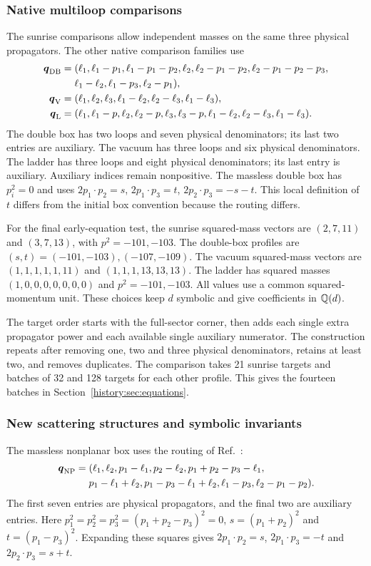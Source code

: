 \subsubsection{Native multiloop comparisons}
The sunrise comparisons allow independent masses on the same three physical propagators. The other native comparison families use
\begin{align}
 \boldsymbol q_{\rm DB}={}&(\ell_1,\ell_1-p_1,\ell_1-p_1-p_2,
 \ell_2,\ell_2-p_1-p_2,\ell_2-p_1-p_2-p_3,\nonumber\\
 &\ell_1-\ell_2,\ell_1-p_3,\ell_2-p_1),\\
 \boldsymbol q_{\rm V}={}&(\ell_1,\ell_2,\ell_3,\ell_1-\ell_2,
 \ell_2-\ell_3,\ell_1-\ell_3),\\
 \boldsymbol q_{\rm L}={}&(\ell_1,\ell_1-p,\ell_2,\ell_2-p,\ell_3,
 \ell_3-p,\ell_1-\ell_2,\ell_2-\ell_3,\ell_1-\ell_3).
\end{align}
The double box has two loops and seven physical denominators; its last two entries are auxiliary. The vacuum has three loops and six physical denominators. The ladder has three loops and eight physical denominators; its last entry is auxiliary. Auxiliary indices remain nonpositive. The massless double box has $p_i^2=0$ and uses $2p_1\cdot p_2=s$, $2p_1\cdot p_3=t$, $2p_2\cdot p_3=-s-t$. This local definition of $t$ differs from the initial box convention because the routing differs.

For the final early-equation test, the sunrise squared-mass vectors are $(2,7,11)$ and $(3,7,13)$, with $p^2=-101,-103$. The double-box profiles are $(s,t)=(-101,-103),(-107,-109)$. The vacuum squared-mass vectors are $(1,1,1,1,1,11)$ and $(1,1,1,13,13,13)$. The ladder has squared masses $(1,0,0,0,0,0,0,0)$ and $p^2=-101,-103$. All values use a common squared-momentum unit. These choices keep $d$ symbolic and give coefficients in $\mathbb Q(d)$.

The target order starts with the full-sector corner, then adds each single extra propagator power and each available single auxiliary numerator. The construction repeats after removing one, two and three physical denominators, retains at least two, and removes duplicates. The comparison takes 21 sunrise targets and batches of 32 and 128 targets for each other profile. This gives the fourteen batches in Section~\ref{history:sec:equations}.

\subsubsection{New scattering structures and symbolic invariants}
The massless nonplanar box uses the routing of Ref.~\cite{KiraOriginal}:
\begin{align}
 \boldsymbol q_{\rm NP}={}&(\ell_1,\ell_2,p_1-\ell_1,p_2-\ell_2,
 p_1+p_2-p_3-\ell_1,\nonumber\\
 &p_1-\ell_1+\ell_2,p_1-p_3-\ell_1+\ell_2,
 \ell_1-p_3,\ell_2-p_1-p_2).
\end{align}
The first seven entries are physical propagators, and the final two are auxiliary entries. Here $p_1^2=p_2^2=p_3^2=(p_1+p_2-p_3)^2=0$, $s=(p_1+p_2)^2$ and $t=(p_1-p_3)^2$. Expanding these squares gives $2p_1\cdot p_2=s$, $2p_1\cdot p_3=-t$ and $2p_2\cdot p_3=s+t$.

